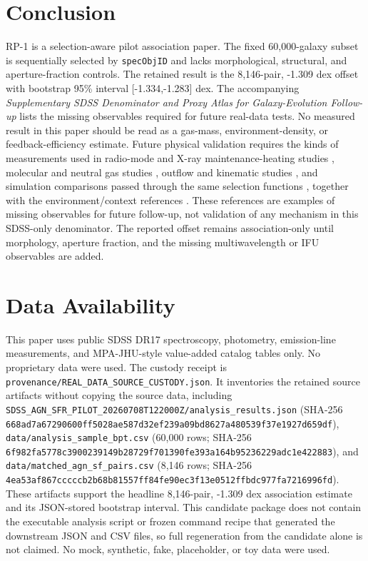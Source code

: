 \documentclass[twocolumn]{aastex631}
\begin{document}
\section{Conclusion}
RP-1 is a selection-aware pilot association paper. The fixed 60,000-galaxy subset is sequentially selected by \texttt{specObjID} and lacks morphological, structural, and aperture-fraction controls. The retained result is the 8,146-pair, -1.309 dex offset with bootstrap 95\% interval [-1.334,-1.283] dex. The accompanying \emph{Supplementary SDSS Denominator and Proxy Atlas for Galaxy-Evolution Follow-up} lists the missing observables required for future real-data tests. No measured result in this paper should be read as a gas-mass, environment-density, or feedback-efficiency estimate.
Future physical validation requires the kinds of measurements used in radio-mode and X-ray maintenance-heating studies \citep{best2005,fabian2012,mcnamara2007,heckmanbest2014,lamassa2013}, molecular and neutral gas studies \citep{xcoldgass2017,xgass2018}, outflow and kinematic studies \citep{veilleux2005,cicone2014,carniani2017,fiore2017}, and simulation comparisons passed through the same selection functions \citep{simba2019,tng2019,eagle2015}, together with the environment/context references \citep{peng2010,ellison2011,piotrowska2022,wetzel2013,dekel2006}. These references are examples of missing observables for future follow-up, not validation of any mechanism in this SDSS-only denominator. The reported offset remains association-only until morphology, aperture fraction, and the missing multiwavelength or IFU observables are added.

\section*{Data Availability}
This paper uses public SDSS DR17 spectroscopy, photometry, emission-line measurements, and MPA-JHU-style value-added catalog tables only. No proprietary data were used. The custody receipt is \texttt{provenance/REAL\_DATA\_SOURCE\_CUSTODY.json}. It inventories the retained source artifacts without copying the source data, including \texttt{SDSS\_AGN\_SFR\_PILOT\_20260708T122000Z/analysis\_results.json} (SHA-256 \texttt{668ad7a67290600ff5028ae587d32ef239a09bd8627a480539f37e1927d659df}), \texttt{data/analysis\_sample\_bpt.csv} (60,000 rows; SHA-256 \texttt{6f982fa5778c3900239149b28729f701390fe393a164b95236229adc1e422883}), and \texttt{data/matched\_agn\_sf\_pairs.csv} (8,146 rows; SHA-256 \texttt{4ea53af867cccccb2b68b81557ff84fe90ec3f13e0512ffbdc977fa7216996fd}). These artifacts support the headline 8,146-pair, -1.309 dex association estimate and its JSON-stored bootstrap interval. This candidate package does not contain the executable analysis script or frozen command recipe that generated the downstream JSON and CSV files, so full regeneration from the candidate alone is not claimed. No mock, synthetic, fake, placeholder, or toy data were used.
\end{document}
